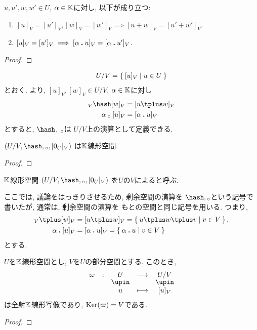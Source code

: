\begin{lemma}
\label{lem:quotientspace:well:def}
  $u,u',w,w'\in U$, $\alpha \in \mathbb{K}$に対し, 以下が成り立つ:  
  \begin{enumerate}
  \item $[u]_V=[u']_V, [w]_V=[w']_V \implies [u\plus w]_V=[u'\plus w']_V$.
  \item $[u]_V=[u']_V \implies [\alpha\mathbin{\boldsymbol{.}} u]_V=[\alpha\mathbin{\boldsymbol{.}} u']_V$.
  \end{enumerate}
\end{lemma}
\begin{proof}\end{proof}

\begin{align*}
  U/V=\Set{[u]_V|u\in U}
\end{align*}
とおく.
より,
$[u]_V,[w]_V\in U/V$, $\alpha\in\mathbb{K}$に対し
\begin{align*}
[u]_V\pplus [w]_V &= [u\plus w]_V\\
\alpha\aact [u]_V &= [\alpha\act u]_V
\end{align*}
とすると,
$\pplus$, $\mathbin{{}_\circ}$は
$U/V$上の演算として定義できる.
\begin{lemma}
  $(U/V,\pplus,\aact,[0_U]_V)$
  は$\mathbb{K}$線形空間.
\end{lemma}
\begin{proof}\end{proof}
\begin{definition}
  $\mathbb{K}$線形空間
  $(U/V,\pplus,\aact,[0_U]_V)$
  を$U$の$V$によると呼ぶ.
\end{definition}

\begin{remark}
  ここでは,
  議論をはっきりさせるため,
  剰余空間の演算を
  $\pplus,\aact$という記号で書いたが,
  通常は,
  剰余空間の演算を
  もとの空間と同じ記号を用いる.
  つまり,
  \begin{align*}
    [u]_V\plus [w]_V&=[u \plus w]_V=\Set{u \plus w \plus v|v\in V}, \\
    \alpha \act [u]_V&=[\alpha \act u]_V=\Set{\alpha\act u|v\in V}
  \end{align*}
  とする.
\end{remark}

\begin{prop}
$U$を$\mathbb{K}$線形空間とし,
$V$を$U$の部分空間とする.
このとき,
\begin{align*}
\shazo{\varpi}{U}{U/V}
{u}{[u]_V}
\end{align*}
は全射$\mathbb{K}$線形写像であり,
$\operatorname{Ker}(\varpi)=V$である.
\end{prop}
\begin{proof}\end{proof}

